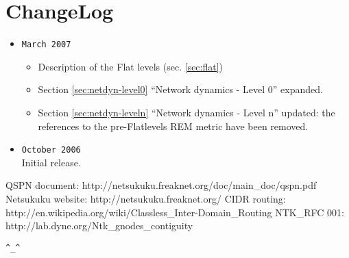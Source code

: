 \documentclass[a4paper]{article}
\newcommand{\href}[2]{ #1 }
\begin{document}
\section{ChangeLog}
\begin{itemize}
	\item \verb|March 2007|
		\begin{itemize}
			\item Description of the Flat levels (sec. \ref{sec:flat})
			\item Section \ref{sec:netdyn-level0} ``Network dynamics - Level 0'' expanded.
			\item Section \ref{sec:netdyn-leveln} ``Network
				dynamics - Level n'' updated: the references to
				the pre-Flatlevels REM metric have been
				removed.
		\end{itemize}
	\item \verb|October 2006|\\
		Initial release.
\end{itemize}

\begin{thebibliography}{99}
	 QSPN document:
		\href{http://netsukuku.freaknet.org/doc/main\_doc/qspn.pdf}{qspn.pdf}
	 Netsukuku website:
		\href{http://netsukuku.freaknet.org/}{http://netsukuku.freaknet.org/}
	 CIDR routing:
		\href{http://en.wikipedia.org/wiki/Classless\_Inter-Domain\_Routing}{Classless\_Inter-Domain\_Routing in Wikipedia}
	 NTK\_RFC 001:
		\href{http://lab.dyne.org/Ntk\_gnodes\_contiguity}{Gnode contiguity}
\end{thebibliography}
\newpage

\begin{center}
\verb|^_^|
\end{center}
\end{document}
